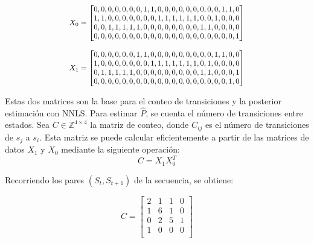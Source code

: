 \begin{examplex}
\begin{equation*}
\resizebox{0.6\textwidth}{!}{$
X_0 =
\begin{bmatrix}
0 , 0 , 0 , 0 , 0 , 0 , 0 , 1 , 1 , 0 , 0 , 0 , 0 , 0 , 0 , 0 , 0 , 0 , 1 , 1 , 0 \\
1 , 1 , 0 , 0 , 0 , 0 , 0 , 0 , 0 , 1 , 1 , 1 , 1 , 1 , 1 , 0 , 0 , 1 , 0 , 0 , 0 \\
0 , 0 , 1 , 1 , 1 , 1 , 1 , 0 , 0 , 0 , 0 , 0 , 0 , 0 , 0 , 1 , 1 , 0 , 0 , 0 , 0 \\
0 , 0 , 0 , 0 , 0 , 0 , 0 , 0 , 0 , 0 , 0 , 0 , 0 , 0 , 0 , 0 , 0 , 0 , 0 , 0 , 1
\end{bmatrix}
$}
\label{eq:matrix_X0}
\end{equation*}

\begin{equation*}
\resizebox{0.6\textwidth}{!}{$
X_1 =
\begin{bmatrix}
0 , 0 , 0 , 0 , 0 , 0 , 1 , 1 , 0 , 0 , 0 , 0 , 0 , 0 , 0 , 0 , 0 , 1 , 1 , 0 , 0 \\
1 , 0 , 0 , 0 , 0 , 0 , 0 , 0 , 1 , 1 , 1 , 1 , 1 , 1 , 1 , 0 , 1 , 0 , 0 , 0 , 0 \\
0 , 1 , 1 , 1 , 1 , 1 , 0 , 0 , 0 , 0 , 0 , 0 , 0 , 0 , 0 , 1 , 1 , 0 , 0 , 0 , 1 \\
0 , 0 , 0 , 0 , 0 , 0 , 0 , 0 , 0 , 0 , 0 , 0 , 0 , 0 , 0 , 0 , 0 , 0 , 0 , 1 , 0 
\end{bmatrix}
$}
\label{eq:matrix_X1}
\end{equation*}

Estas dos matrices son la base para el conteo de transiciones y la posterior estimación con NNLS. Para estimar \(\hat{P}\), se cuenta el número de transiciones entre estados. Sea \(C \in \mathbb{Z}^{4 \times 4}\) la matriz de conteo, donde \(C_{ij}\) es el número de transiciones de \(s_j\) a \(s_i\). Esta matriz se puede calcular eficientemente a partir de las matrices de datos \(X_1\) y \(X_0\) mediante la siguiente operación:
\begin{equation}
    C = X_1 X_0^T
\end{equation}

Recorriendo los pares \((S_t, S_{t+1})\) de la secuencia, se obtiene:

\[
C = 
\begin{bmatrix}
2 & 1 & 1 & 0 \\
1 & 6 & 1 & 0 \\
0 & 2 & 5 & 1 \\
1 & 0 & 0 & 0 \\
\end{bmatrix}
\]


\end{examplex}
